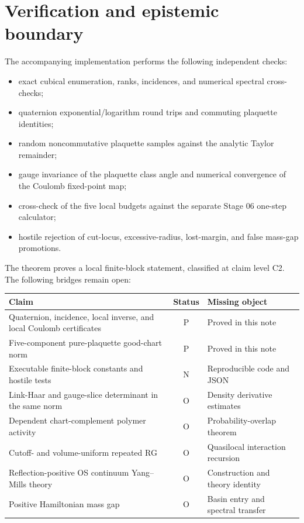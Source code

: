 \documentclass[11pt]{article}
\theoremstyle{definition}
\newcommand{\statusP}{\textcolor{green!45!black}{\textsf{P}}}
\newcommand{\statusN}{\textcolor{blue!65!black}{\textsf{N}}}
\newcommand{\statusO}{\textcolor{red!70!black}{\textsf{O}}}
\begin{document}
\section{Verification and epistemic boundary}

The accompanying implementation performs the following independent checks:
\begin{itemize}
\item exact cubical enumeration, ranks, incidences, and numerical spectral
cross-checks;
\item quaternion exponential/logarithm round trips and commuting plaquette
identities;
\item random noncommutative plaquette samples against the analytic Taylor
remainder;
\item gauge invariance of the plaquette class angle and numerical convergence
of the Coulomb fixed-point map;
\item cross-check of the five local budgets against the separate Stage 06
one-step calculator;
\item hostile rejection of cut-locus, excessive-radius, lost-margin, and
false mass-gap promotions.
\end{itemize}

The theorem proves a local finite-block statement, classified at claim level
C2.  The following bridges remain open:
\begin{longtable}{>{\raggedright\arraybackslash}p{}c>{\raggedright\arraybackslash}p{}}
\toprule
Claim & Status & Missing object\\
\midrule
Quaternion, incidence, local inverse, and local Coulomb certificates & \statusP & Proved in this note\\
Five-component pure-plaquette good-chart norm & \statusP & Proved in this note\\
Executable finite-block constants and hostile tests & \statusN & Reproducible code and JSON\\
Link-Haar and gauge-slice determinant in the same norm & \statusO & Density derivative estimates\\
Dependent chart-complement polymer activity & \statusO & Probability-overlap theorem\\
Cutoff- and volume-uniform repeated RG & \statusO & Quasilocal interaction recursion\\
Reflection-positive OS continuum Yang--Mills theory & \statusO & Construction and theory identity\\
Positive Hamiltonian mass gap & \statusO & Basin entry and spectral transfer\\
\bottomrule
\end{longtable}
\end{document}
